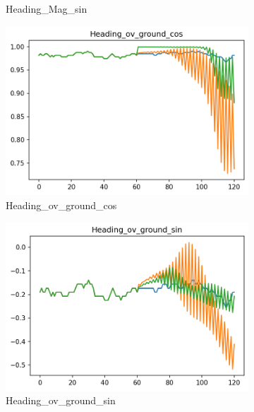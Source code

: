 \begin{figure}[ht]
\begin{subfigure}[b]{0.32\textwidth}
         \caption{Heading\_Mag\_sin}
     \end{subfigure}
     \begin{subfigure}[b]{0.32\textwidth}
         \centering
         \includegraphics[width=\textwidth]{figures/prediction-plots-joint/Heading_ov_ground_cos.png}
         \caption{Heading\_ov\_ground\_cos}
     \end{subfigure}
     \begin{subfigure}[b]{0.32\textwidth}
         \centering
         \includegraphics[width=\textwidth]{figures/prediction-plots-joint/Heading_ov_ground_sin.png}
         \caption{Heading\_ov\_ground\_sin}
     \end{subfigure}
     \begin{subfigure}[b]{0.32\textwidth}
         \centering

\end{subfigure}
\end{figure}
